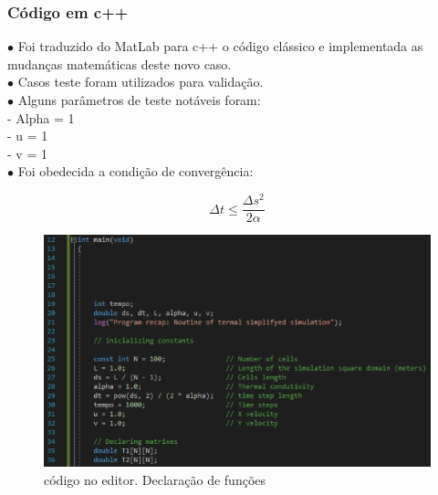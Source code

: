 \documentclass[xcolor=dvipsnames,10pt,aspectratio=169]{beamer}
\begin{document}
	
	\begin{frame} 
	\frametitle{Código em c++}
	\begin{minipage}[h!]{0.49\textwidth}
	$\bullet$ Foi traduzido do MatLab para c++ o código clássico e implementada as mudanças matemáticas deste novo caso.\\
	$\bullet$ Casos teste foram utilizados para validação.\\
	$\bullet$ Alguns parâmetros de teste notáveis foram: \\
	
	- Alpha = 1 \\
	- u = 1 \\
	- v = 1 \\
	
	$\bullet$ Foi obedecida a condição de convergência:
	
	\begin{equation}
	\Delta t \leq \frac{\Delta s ^2}{2 \alpha} 
	\end{equation}
		
	\end{minipage}
	\begin{minipage}[h!]{0.49\textwidth}
		\begin{figure}[h!]
		\centering
		\includegraphics[trim = {0cm 1cm 5cm 1cm}, clip , angle=0, scale=0.65]{printCodigo1}
		\caption{código no editor. Declaração de funções}
	\end{figure}
	\end{minipage}
	\end{frame}
	
	
	
	
	
\end{document}
